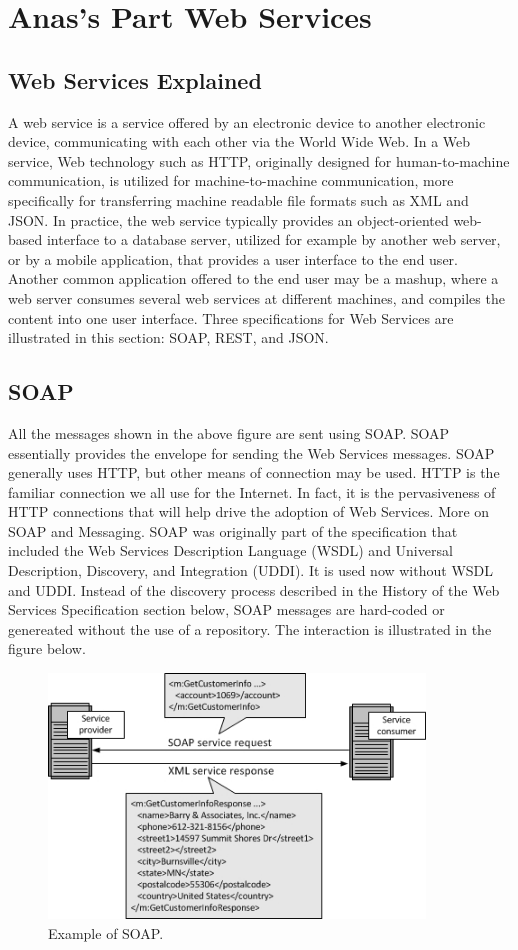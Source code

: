 \documentclass[12pt,a4paper]{report}
\begin{document}
\chapter{Anas's Part Web Services}
	
\section{Web Services Explained}
	A web service is a service offered by an electronic device to another electronic device, communicating with each other via the World Wide Web. In a Web service, Web technology such as HTTP, originally designed for human-to-machine communication, is utilized for machine-to-machine communication, more specifically for transferring machine readable file formats such as XML and JSON. In practice, the web service typically provides an object-oriented web-based interface to a database server, utilized for example by another web server, or by a mobile application, that provides a user interface to the end user. Another common application offered to the end user may be a mashup, where a web server consumes several web services at different machines, and compiles the content into one user interface.
	Three specifications for Web Services are illustrated in this section: SOAP, REST, and JSON.\cite{WEB}
	\section{SOAP}
	All the messages shown in the above figure are sent using SOAP. SOAP essentially provides the envelope for sending the Web Services messages. SOAP generally uses HTTP, but other means of connection may be used. HTTP is the familiar connection we all use for the Internet. In fact, it is the pervasiveness of HTTP connections that will help drive the adoption of Web Services. More on SOAP and Messaging.
	SOAP was originally part of the specification that included the Web Services Description Language (WSDL) and Universal Description, Discovery, and Integration (UDDI). It is used now without WSDL and UDDI. Instead of the discovery process described in the History of the Web Services Specification section below, SOAP messages are hard-coded or genereated without the use of a repository. The interaction is illustrated in the figure below. 
	
		\begin{figure}[h]
			\centering
			\includegraphics[width=10cm]{SOAP.jpg}
			\caption{Example of SOAP.}
		\end{figure}
\newpage	
\end{document}
